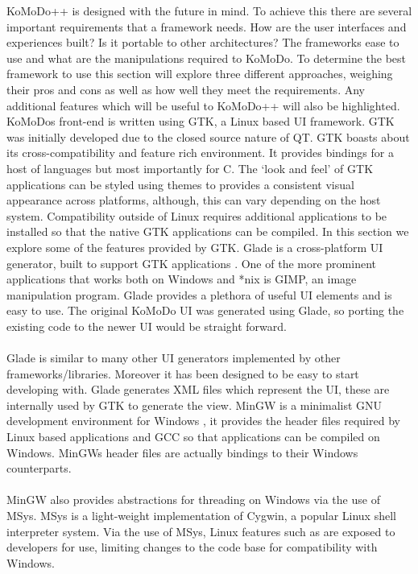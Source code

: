 \graphicspath{ {images/research/} }
%
KoMoDo++ is designed with the future in mind. To achieve this there are several important requirements that a framework needs. How are the user interfaces and experiences built? Is it portable to other architectures? The frameworks ease to use and what are the manipulations required to KoMoDo. To determine the best framework to use this section will explore three different approaches, weighing their pros and cons as well as how well they meet the requirements. Any additional features which will be useful to KoMoDo++ will also be highlighted.
%
KoMoDos front-end is written using GTK, a Linux based UI framework. GTK was initially developed due to the closed source nature of QT. GTK boasts about its cross-compatibility and feature rich environment\cite{gtk}. It provides bindings for a host of languages but most importantly for C. The  `look and feel' of GTK applications can be styled using themes to provides a consistent visual appearance across platforms, although, this can vary depending on the host system. Compatibility outside of Linux requires additional applications to be installed so that the native GTK applications can be compiled. In this section we explore some of the features provided by GTK.
  Glade is a cross-platform UI generator, built to support GTK applications \cite{glade}. One of the more prominent applications that works both on Windows and *nix is GIMP, an image manipulation program. Glade provides a plethora of useful UI elements and is easy to use. The original KoMoDo UI was generated using Glade, so porting the existing code to the newer UI would be straight forward.\\\\
  Glade is similar to many other UI generators implemented by other frameworks/libraries. Moreover it has been designed to be easy to start developing with. Glade generates XML files which represent the UI, these are internally used by GTK to generate the view.
  MinGW is a minimalist GNU development environment for Windows \cite{mingw}, it provides the header files required by Linux based applications and GCC so that applications can be compiled on Windows. MinGWs header files are actually bindings to their Windows counterparts.\\\\
  MinGW also provides abstractions for threading on Windows via the use of MSys\cite{msys}. MSys is a light-weight implementation of Cygwin, a popular Linux shell interpreter system. Via the use of MSys, Linux features such as  are exposed to developers for use, limiting changes to the code base for compatibility with Windows.
